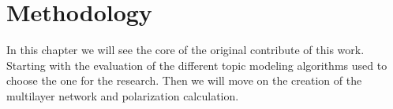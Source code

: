 \chapter{Methodology}
\label{ch:methodology}
In this chapter we will see the core of the original contribute of this work. Starting with the evaluation of the different topic modeling algorithms used to choose the one for the research. Then we will move on the creation of the multilayer network and polarization calculation.


